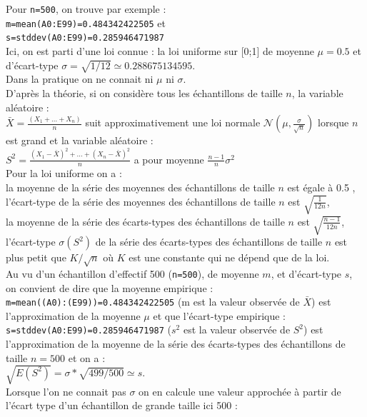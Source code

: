 \documentclass[a4paper,11pt]{book}
\begin{document}
Pour {\tt n=500}, on trouve par exemple :\\
{\tt m=mean(A0:E99)=0.484342422505} et\\
 {\tt s=stddev(A0:E99)=0.285946471987}\\
Ici, on est parti d'une loi connue : la loi uniforme sur [0;1] de moyenne 
$\mu=0.5$ et d'\'ecart-type $\sigma=\sqrt{1/12} \simeq 0.288675134595$. \\
Dans la pratique on ne connait ni $\mu$ ni $\sigma$.\\
D'apr\`es la th\'eorie, si on consid\`ere tous les \'echantillons de taille 
$n$, la variable al\'eatoire :\\
$\bar X=\frac{(X_1+...+X_n)}{n}$ 
suit approximativement une loi normale $\mathcal N(\mu,\frac{\sigma}{\sqrt n})$
lorsque $n$ est grand et la variable al\'eatoire :\\
$S^2=\frac{(X_1-\bar X)^2+...+(X_n-\bar X)^2}{n}$  a pour moyenne $\frac{n-1}{n}\sigma^2$\\
Pour la loi uniforme on a :\\
la moyenne de la s\'erie des moyennes des \'echantillons de taille $n$ 
est \'egale \`a 0.5 ,\\
l'\'ecart-type de la s\'erie des moyennes des \'echantillons de taille $n$ est
$\sqrt{\frac{1}{12 n}}$,\\
la moyenne de la s\'erie des \'ecarts-types des \'echantillons de taille $n$ 
est $\sqrt{\frac{n-1}{12 n}}$,\\
l'\'ecart-type $\sigma(S^2)$ de la s\'erie  des \'ecarts-types des \'echantillons de taille $n$ est plus petit que $K/\sqrt n$  o\`u $K$ est une constante qui ne d\'epend que de la loi.\\
Au vu d'un \'echantillon d'effectif 500 ({\tt n=500}), de moyenne $m$, et 
d'\'ecart-type $s$, on convient de dire
 que la moyenne empirique :\\
 {\tt m=mean((A0):(E99))=0.484342422505} (m est la valeur observ\'ee de 
$\bar X$)
est l'approximation de la moyenne $\mu$ et que l'\'ecart-type empirique :\\
 {\tt s=stddev(A0:E99)=0.285946471987} ($s^2$ est la valeur observ\'ee de 
$S^2$) est l'approximation de la moyenne de la s\'erie des \'ecarts-types des \'echantillons de taille $n=500$ et on a :\\
  $\sqrt{E(S^2)}=\sigma*\sqrt{499/500} \simeq s$.\\
Lorsque l'on ne connait pas $\sigma$ on en calcule une valeur approch\'ee 
\`a partir de l'\'ecart type d'un \'echantillon de grande taille ici 500 :\\
\end{document}
